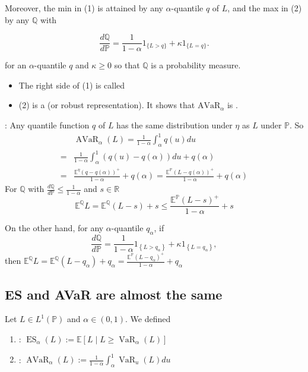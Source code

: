 Moreover, the min in (1) is attained by any $\alpha$-quantile $q$ of $L$, and the max in (2) by any $\mathbb{Q}$ with

$$
\frac{d \mathbb{Q}}{d \mathbb{P}}=\frac{1}{1-\alpha} 1_{\{L>q\}}+\kappa 1_{\{L=q\}} .
$$

for an $\alpha$-quantile $q$ and $\kappa \geq 0$ so that $\mathbb{Q}$ is a probability measure.
\begin{itemize}[leftmargin=*]
    \item The right side of (1) is called 
    \item (2) is a  (or robust representation). It shows that $\mathrm{AVaR}_{\alpha}$ is .
\end{itemize}

: Any quantile function $q$ of $L$ has the same distribution under $\eta$ as $L$ under $\mathbb{P}$. So
$$
\begin{aligned}
& \operatorname{AVaR}_{\alpha}(L)=\frac{1}{1-\alpha} \int_{\alpha}^{1} q(u) d u \\
=&\frac{1}{1-\alpha} \int_{\alpha}^{1}(q(u)-q(\alpha)) d u+q(\alpha) \\
=& \frac{\mathbb{E}^{\eta}(q-q(\alpha))^{+}}{1-\alpha}+q(\alpha)=\frac{\mathbb{E}^{\mathbb{P}}(L-q(\alpha))^{+}}{1-\alpha}+q(\alpha)
\end{aligned}
$$
For $\mathbb{Q}$ with $\frac{d \mathbb{Q}}{d \mathbb{P}} \leq \frac{1}{1-\alpha}$ and $s \in \mathbb{R}$
$$
\mathbb{E}^{\mathbb{Q}} L=\mathbb{E}^{\mathbb{Q}}(L-s)+s \leq \frac{\mathbb{E}^{\mathbb{P}}(L-s)^{+}}{1-\alpha}+s
$$

On the other hand, for any $\alpha$-quantile $q_{\alpha}$, if
$$
\frac{d \mathbb{Q}}{d \mathbb{P}}=\frac{1}{1-\alpha} 1_{\left\{L>q_{\alpha}\right\}}+\kappa 1_{\left\{L=q_{\alpha}\right\}},
$$
then
$
\mathbb{E}^{\mathbb{Q}} L=\mathbb{E}^{\mathbb{Q}}\left(L-q_{\alpha}\right)+q_{\alpha}=\frac{\mathbb{E}^{\mathbb{P}}\left(L-q_{\alpha}\right)^{+}}{1-\alpha}+q_{\alpha}
$






\subsection*{ES and AVaR are almost the same}
Let $L \in L^{1}(\mathbb{P})$ and $\alpha \in(0,1)$. We defined
\begin{enumerate}[leftmargin=*]
    \item {}: $\operatorname{ES}_{\alpha}(L):=\mathbb{E}\left[L \mid L \geq \operatorname{VaR}_{\alpha}(L)\right]$
    \item {}: $\operatorname{AVaR}_{\alpha}(L):=\frac{1}{1-\alpha} \int_{\alpha}^{1} \operatorname{VaR}_{u}(L) d u$
\end{enumerate}


